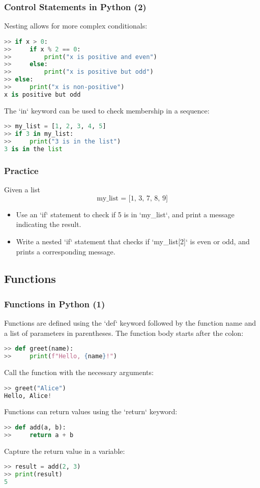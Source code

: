 \begin{frame}[fragile]
  \frametitle{Control Statements in Python (2)}
  Nesting allows for more complex conditionals:
  \begin{lstlisting}[language=Python]
>> if x > 0:
>>     if x % 2 == 0:
>>         print("x is positive and even")
>>     else:
>>         print("x is positive but odd")
>> else:
>>     print("x is non-positive")
x is positive but odd
  \end{lstlisting}\pause
  The `in` keyword can be used to check membership in a sequence:
  \begin{lstlisting}[language=Python]
>> my_list = [1, 2, 3, 4, 5]
>> if 3 in my_list:
>>     print("3 is in the list")
3 is in the list
  \end{lstlisting}
\end{frame}

\begin{frame}[fragile]
 \frametitle{Practice}
 Given a list
 \[
    \text{my\_list = [1, 3, 7, 8, 9]}
 \]
 \begin{itemize}
  \item Use an `if` statement to check if 5 is in `my\_list`, and print a message indicating the result.\pause
  \item Write a nested `if` statement that checks if `my\_list[2]` is even or odd, and prints a corresponding message.
 \end{itemize}
\end{frame}

\subsection*{Functions}
\begin{frame}[fragile]
  \frametitle{Functions in Python (1)}
  Functions are defined using the `def` keyword followed by the function name and a list of parameters in parentheses. The function body starts after the colon:
  \begin{lstlisting}[language=Python]
>> def greet(name):
>>     print(f"Hello, {name}!")
  \end{lstlisting}\pause
  Call the function with the necessary arguments:
  \begin{lstlisting}[language=Python]
>> greet("Alice")
Hello, Alice!
  \end{lstlisting}\pause
  Functions can return values using the `return` keyword:
  \begin{lstlisting}[language=Python]
>> def add(a, b):
>>     return a + b
  \end{lstlisting}\pause
  Capture the return value in a variable:
  \begin{lstlisting}[language=Python]
>> result = add(2, 3)
>> print(result)
5
  \end{lstlisting}
\end{frame}

